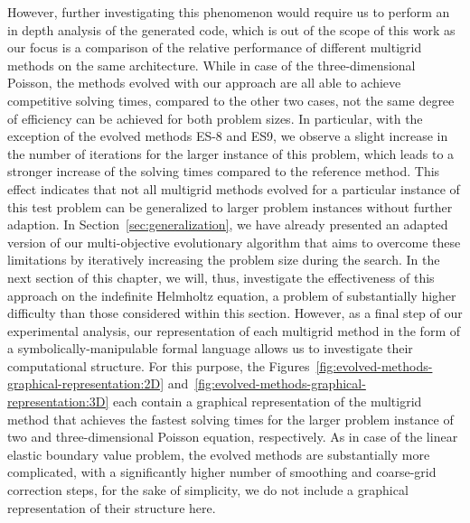 However, further investigating this phenomenon would require us to perform an in depth analysis of the generated code, which is out of the scope of this work as our focus is a comparison of the relative performance of different multigrid methods on the same architecture.
While in case of the three-dimensional Poisson, the methods evolved with our approach are all able to achieve competitive solving times, compared to the other two cases, not the same degree of efficiency can be achieved for both problem sizes.
In particular, with the exception of the evolved methods ES-8 and ES9, we observe a slight increase in the number of iterations for the larger instance of this problem, which leads to a stronger increase of the solving times compared to the reference method.
This effect indicates that not all multigrid methods evolved for a particular instance of this test problem can be generalized to larger problem instances without further adaption.
In Section~\ref{sec:generalization}, we have already presented an adapted version of our multi-objective evolutionary algorithm that aims to overcome these limitations by iteratively increasing the problem size during the search.
In the next section of this chapter, we will, thus, investigate the effectiveness of this approach on the indefinite Helmholtz equation, a problem of substantially higher difficulty than those considered within this section.
However, as a final step of our experimental analysis, our representation of each multigrid method in the form of a symbolically-manipulable formal language allows us to investigate their computational structure.
For this purpose, the Figures~\ref{fig:evolved-methods-graphical-representation:2D} and~\ref{fig:evolved-methods-graphical-representation:3D} each contain a graphical representation of the multigrid method that achieves the fastest solving times for the larger problem instance of two and three-dimensional Poisson equation, respectively.
As in case of the linear elastic boundary value problem, the evolved methods are substantially more complicated, with a significantly higher number of smoothing and coarse-grid correction steps, for the sake of simplicity, we do not include a graphical representation of their structure here.

